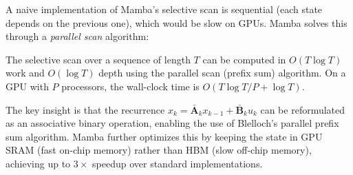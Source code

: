 A naive implementation of Mamba's selective scan is sequential (each state depends on the previous one), which would be slow on GPUs. Mamba solves this through a \emph{parallel scan} algorithm:

\begin{proposition}
The selective scan over a sequence of length $T$ can be computed in $O(T \log T)$ work and $O(\log T)$ depth using the parallel scan (prefix sum) algorithm. On a GPU with $P$ processors, the wall-clock time is $O(T \log T / P + \log T)$.
\end{proposition}

The key insight is that the recurrence $x_k = \bar{\mathbf{A}}_k x_{k-1} + \bar{\mathbf{B}}_k u_k$ can be reformulated as an associative binary operation, enabling the use of Blelloch's parallel prefix sum algorithm. Mamba further optimizes this by keeping the state in GPU SRAM (fast on-chip memory) rather than HBM (slow off-chip memory), achieving up to $3\times$ speedup over standard implementations.

